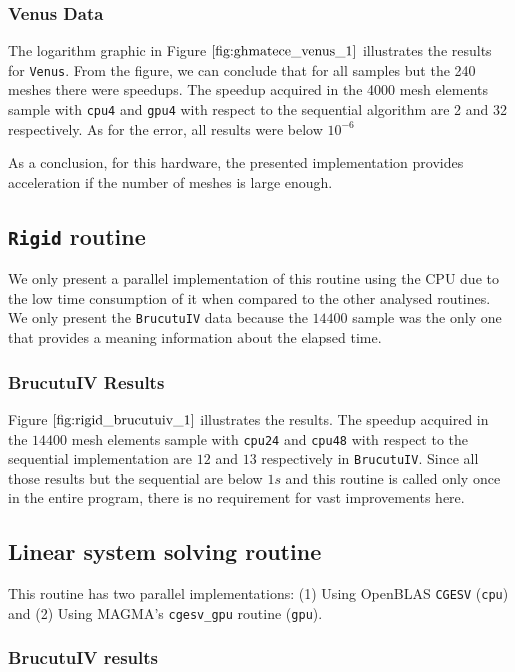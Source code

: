 \subsubsection{Venus Data}

The logarithm graphic in Figure $\ref{fig:ghmatece_venus_1}$ illustrates the results for \texttt{Venus}. 
From the figure, we can conclude that for all samples but the 240 meshes there were speedups. The speedup 
acquired in the 4000 mesh elements sample with \texttt{cpu4} and \texttt{gpu4} with respect to the sequential algorithm are 2 and 32 respectively.
As for the error, all results were below  $10^{-6}$

As a conclusion, for this hardware, the presented implementation provides acceleration if the number of meshes is large enough. 

\subsection{\texttt{Rigid} routine}

We only present a parallel implementation of this routine using the CPU due to the low time 
consumption of it when compared to the other analysed routines. We only present the \texttt{BrucutuIV} 
data because the $14400$ sample was the only one that provides a meaning information about the elapsed time.

\subsubsection{BrucutuIV Results}

Figure $\ref{fig:rigid_brucutuiv_1}$ illustrates the results. The speedup acquired in the $14400$ mesh elements 
sample with  \texttt{cpu24} and \texttt{cpu{48}} with respect to the sequential implementation are $12$ and $13$ 
respectively in \texttt{BrucutuIV}. 
Since all those results but the sequential are below $1s$ and this routine is called only once in the entire program, 
there is no requirement for vast improvements here.

\subsection{Linear system solving routine}

This routine has two parallel implementations: (1) Using OpenBLAS \texttt{CGESV} 
(\texttt{cpu}) and (2) Using MAGMA's \texttt{cgesv\_gpu} routine (\texttt{gpu}). 

\subsubsection{BrucutuIV results}

